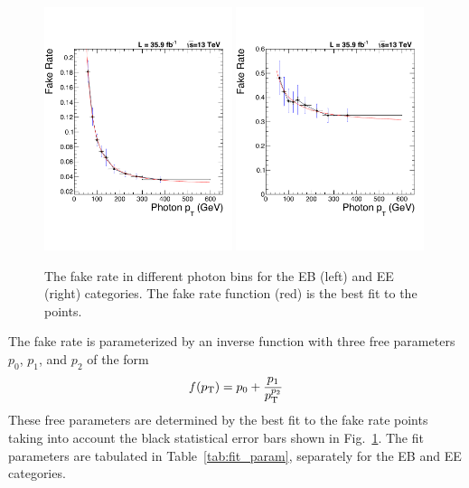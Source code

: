 \begin{figure}[!htbp]
  \centering
  \includegraphics[width=0.49\textwidth]{figures/EBfit2016.pdf}
  \includegraphics[width=0.49\textwidth]{figures/EEfit2016.pdf}
  \caption{The fake rate in different photon \pt bins for the EB (left) and EE (right) categories. The fake rate function (red) is the best fit to the points.}
  \label{fig:fake_rate}
\end{figure}

The fake rate is parameterized by an inverse function with three free parameters $p_0$, $p_1$, and $p_2$ of the form
\begin{equation}\label{eqn:fake_rate_fn}
  f(p_{\mathrm{T}}) = p_0 + \frac{p_1}{p_{\mathrm{T}}^{p_2}}
\end{equation}
These free parameters are determined by the best fit to the fake rate points taking into account the black statistical error bars shown in Fig.~\ref{fig:fake_rate}. The fit parameters are tabulated in Table~\ref{tab:fit_param}, separately for the EB and EE categories.

